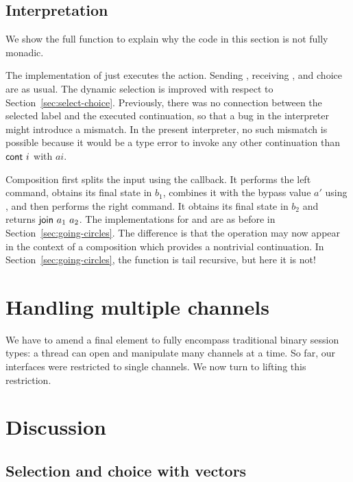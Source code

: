 \documentclass[acmsmall,screen,anonymous,review]{acmart}
\begin{document}
\subsection{Interpretation}
\label{sec:interpretation}


We show the full {\Aexecutor} function to explain why the code in
this section is not fully monadic.
\cstExec

The implementation of {\ACSKIP} just executes the action.
Sending  {\ACSEND}, receiving  {\ACRECV}, and choice {\ACCHOICE} are as usual.
The dynamic selection is improved with respect to
Section~\ref{sec:select-choice}. Previously, there was no connection
between the selected label and the executed continuation, so that a
bug in the interpreter might introduce a mismatch. In the present
interpreter, no such mismatch is possible because it would be a type
error to invoke any other continuation than $\Acont~i$ with $ai$.

Composition first splits the input using the {\Asplit} callback. It performs the left command, obtains its final state in
$b_1$, combines it with the bypass value $a'$ using {\Across}, and
then performs the right command. It obtains its final state in
$b_2$ and returns $\Ajoin~a_1~a_2$.
The implementations for {\AMU} and {\ACONTINUE} are as before in
Section~\ref{sec:going-circles}. The difference is that the
{\ACONTINUE} operation may now appear in the context of a composition
which provides a nontrivial continuation. In
Section~\ref{sec:going-circles}, the function {\Aexecutor} is tail
recursive, but here it is not!




\section{Handling multiple channels}
\label{sec:handl-mult-chann}

We have to amend a final element to fully encompass traditional binary
session types: a thread can open and manipulate many channels at a
time. So far, our interfaces were restricted to single channels. We
now turn to lifting this restriction.



\newpage

\section{Discussion}
\label{sec:discussion}


\subsection{Selection and choice with vectors}
\label{sec:select-choice-with}
\end{document}

